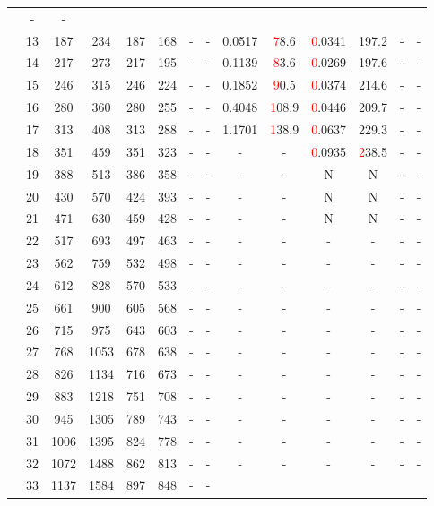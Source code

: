 \begin{table}[htb]
{\begin{tabular}{|c|c|c|c|c|c|c|c|c|c|c|c|c|c|}
 & - & -
 \\
 & 
13 & 187 & 234 & 187 & 168
 & - & -
 & 0.0517 & \textcolor{red}78.6
 & \textcolor{red}0.0341 & 197.2
 & - & -
 \\
 & 
14 & 217 & 273 & 217 & 195
 & - & -
 & 0.1139 & \textcolor{red}83.6
 & \textcolor{red}0.0269 & 197.6
 & - & -
 \\
 & 
15 & 246 & 315 & 246 & 224
 & - & -
 & 0.1852 & \textcolor{red}90.5
 & \textcolor{red}0.0374 & 214.6
 & - & -
 \\
 & 
16 & 280 & 360 & 280 & 255
 & - & -
 & 0.4048 & \textcolor{red}108.9
 & \textcolor{red}0.0446 & 209.7
 & - & -
 \\
 & 
17 & 313 & 408 & 313 & 288
 & - & -
 & 1.1701 & \textcolor{red}138.9
 & \textcolor{red}0.0637 & 229.3
 & - & -
 \\
 & 
18 & 351 & 459 & 351 & 323
 & - & -
 & - & -
 & \textcolor{red}0.0935 & \textcolor{red}238.5
 & - & -
 \\
 & 
19 & 388 & 513 & 386 & 358
 & - & -
 & - & -
 & N & N 
 & - & -
 \\
 & 
20 & 430 & 570 & 424 & 393
 & - & -
 & - & -
 & N & N 
 & - & -
 \\
 & 
21 & 471 & 630 & 459 & 428
 & - & -
 & - & -
 & N & N 
 & - & -
 \\
 & 
22 & 517 & 693 & 497 & 463
 & - & -
 & - & -
 & - & -
 & - & -
 \\
 & 
23 & 562 & 759 & 532 & 498
 & - & -
 & - & -
 & - & -
 & - & -
 \\
 & 
24 & 612 & 828 & 570 & 533
 & - & -
 & - & -
 & - & -
 & - & -
 \\
 & 
25 & 661 & 900 & 605 & 568
 & - & -
 & - & -
 & - & -
 & - & -
 \\
 & 
26 & 715 & 975 & 643 & 603
 & - & -
 & - & -
 & - & -
 & - & -
 \\
 & 
27 & 768 & 1053 & 678 & 638
 & - & -
 & - & -
 & - & -
 & - & -
 \\
 & 
28 & 826 & 1134 & 716 & 673
 & - & -
 & - & -
 & - & -
 & - & -
 \\
 & 
29 & 883 & 1218 & 751 & 708
 & - & -
 & - & -
 & - & -
 & - & -
 \\
 & 
30 & 945 & 1305 & 789 & 743
 & - & -
 & - & -
 & - & -
 & - & -
 \\
 & 
31 & 1006 & 1395 & 824 & 778
 & - & -
 & - & -
 & - & -
 & - & -
 \\
 & 
32 & 1072 & 1488 & 862 & 813
 & - & -
 & - & -
 & - & -
 & - & -
 \\
 & 
33 & 1137 & 1584 & 897 & 848
 & - & -

\end{tabular}}
\end{table}
